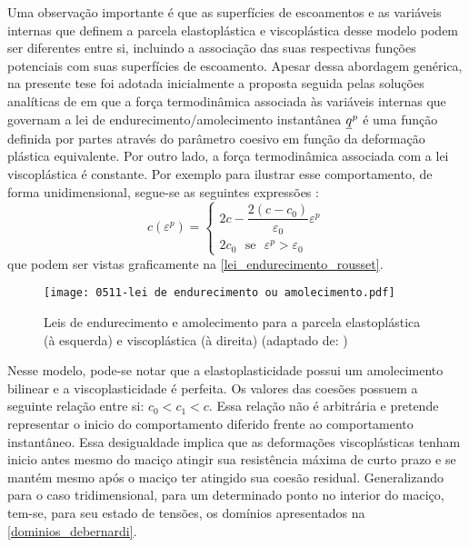 Uma observação importante é que as superfícies de escoamentos e as variáveis internas que definem a parcela elastoplástica e viscoplástica desse modelo podem ser diferentes entre si, incluindo a associação das suas respectivas funções potenciais com suas superfícies de escoamento. Apesar dessa abordagem genérica, na presente tese foi adotada inicialmente a proposta seguida pelas soluções analíticas de  em que a força termodinâmica associada às variáveis internas que governam a lei de endurecimento/amolecimento instantânea $\underline q^p$ é uma função definida por partes através do parâmetro coesivo em função da deformação plástica equivalente. Por outro lado, a força termodinâmica associada com a lei viscoplástica é constante. Por exemplo para ilustrar esse comportamento, de forma unidimensional, segue-se as seguintes expressões \cite[p. 220]{Rousset1988}:
\begin{equation}
	\label{eq:qp_rousset}
	c(\varepsilon^p) = \left\{
		\begin{array}{lcl}
			2c - \dfrac{2(c-c_0)}{\varepsilon_0}\varepsilon^p \\ 
			2c_0~~~\text{se}~~~\varepsilon^p > \varepsilon_0
		\end{array}
	\right.
\end{equation}
que podem ser vistas graficamente na \autoref{lei_endurecimento_rousset}.
\begin{figure}[H]
	\begin{center}
		\texttt{[image: 0511-lei de endurecimento ou amolecimento.pdf]}
	\end{center}
	\caption{\label{lei_endurecimento_rousset}Leis de endurecimento e amolecimento para a parcela elastoplástica (à esquerda) e viscoplástica (à direita) (adaptado de: )}
\end{figure}
Nesse modelo, pode-se notar que a elastoplasticidade possui um amolecimento bilinear e a viscoplasticidade é perfeita. Os valores das coesões possuem a seguinte relação entre si: $c_0 < c_1 < c$. Essa relação não é arbitrária e pretende representar o inicio do comportamento diferido frente ao comportamento instantâneo. Essa desigualdade implica que as deformações viscoplásticas tenham inicio antes mesmo do maciço atingir sua resistência máxima de curto prazo e se mantém mesmo após o maciço ter atingido sua coesão residual. Generalizando para o caso tridimensional, para um determinado ponto no interior do maciço, tem-se, para seu estado de tensões, os domínios apresentados na \autoref{dominios_debernardi}.
